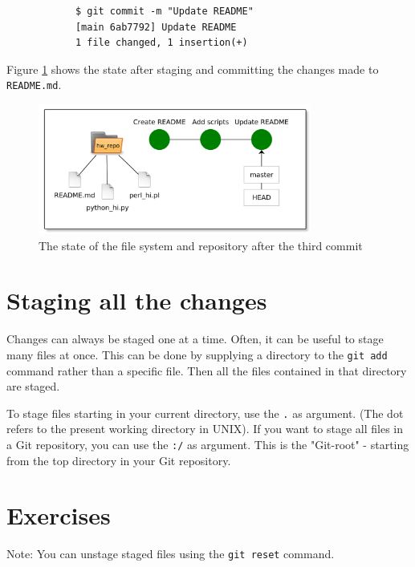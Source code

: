 \documentclass[../main/git_course_main.tex]{subfiles}
\begin{document}
	\begin{codebox}
		\begin{lstlisting}
			$ git commit -m "Update README"
			[main 6ab7792] Update README
			1 file changed, 1 insertion(+)
		\end{lstlisting}
	\end{codebox}
	
	Figure \ref{fig:third_commit} shows the state after staging and committing the changes made to \verb$README.md$.
	
	\begin{figure}[h!]
		\centering
		\includegraphics[width=0.8\textwidth]{../visualizations/chapter2/c26_repo_third_commit.pdf}
		\caption{The state of the file system and repository after the third commit}
		\label{fig:third_commit}
	\end{figure}
	
	\section{Staging all the changes}
	
	Changes can always be staged one at a time. Often, it can be useful to stage many files at once. This can be done by supplying a directory to the \verb$git add$ command rather than a specific file. Then all the files contained in that directory are staged.
	
	To stage files starting in your current directory, use the \verb$.$ as argument. (The dot refers to the present working directory in UNIX).
	If you want to stage all files in a Git repository, you can use the \verb$:/$ as argument. This is the "Git-root" - starting from the top directory
	in your Git repository.
	
	\newpage
	\section{Exercises}
	
	Note: You can unstage staged files using the \verb$git reset$ command.
	
\end{document}
